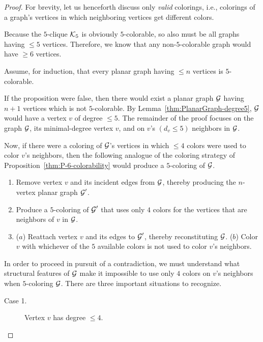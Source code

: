 \begin{proof}
For brevity, let us henceforth discuss only {\em valid} colorings,
i.e., colorings of a graph's vertices in which neighboring vertices get
different colors.

\smallskip

Because the $5$-clique $\mbox{$\cal K$}_5$ is obviously $5$-colorable, so also must
be all graphs having $\leq 5$ vertices.  Therefore, we know that any
non-$5$-colorable graph would have $\geq 6$ vertices.

\smallskip

Assume, for induction, that every planar graph having $\leq n$ vertices
is $5$-colorable.

\smallskip

If the proposition were false, then there would exist a planar graph
$\mbox{$\cal G$}$ having $n+1$ vertices which is not $5$-colorable.  By
Lemma~\ref{thm:PlanarGraph-degree5}, $\mbox{$\cal G$}$ would have a vertex $v$ of
degree $\leq 5$.  The remainder of the proof focuses on the graph
$\mbox{$\cal G$}$, its minimal-degree vertex $v$, and on $v$'s $(d_v \leq 5)$
neighbors in $\mbox{$\cal G$}$.

Now, if there were a coloring of $\mbox{$\cal G$}$'s vertices in which $\leq 4$ colors
were used to color $v$'s neighbors, then the following analogue of the
coloring strategy of Proposition~\ref{thm:P-6-colorability} would
produce a $5$-coloring of $\mbox{$\cal G$}$.
\begin{enumerate}
\item
Remove vertex $v$ and its incident edges from $\mbox{$\cal G$}$, thereby producing
the $n$-vertex planar graph $\mbox{$\cal G$}'$.
\item
Produce a $5$-coloring of $\mbox{$\cal G$}'$ that uses only $4$ colors for the
vertices that are neighbors of $v$ in $\mbox{$\cal G$}$.
\item
($a$) Reattach vertex $v$ and its edges to $\mbox{$\cal G$}'$, thereby reconstituting
  $\mbox{$\cal G$}$.  ($b$) Color $v$ with whichever of the $5$ available colors is
  not used to color $v$'s neighbors.
\end{enumerate}

In order to proceed in pursuit of a contradiction, we must understand
what structural features of $\mbox{$\cal G$}$ make it impossible to use only $4$
colors on $v$'s neighbors when $5$-coloring $\mbox{$\cal G$}$.  There are three
important situations to recognize.
\begin{description}
\item[{\sf Case 1}.]
Vertex $v$ has degree $\leq 4$.


\end{description}
\end{proof}
